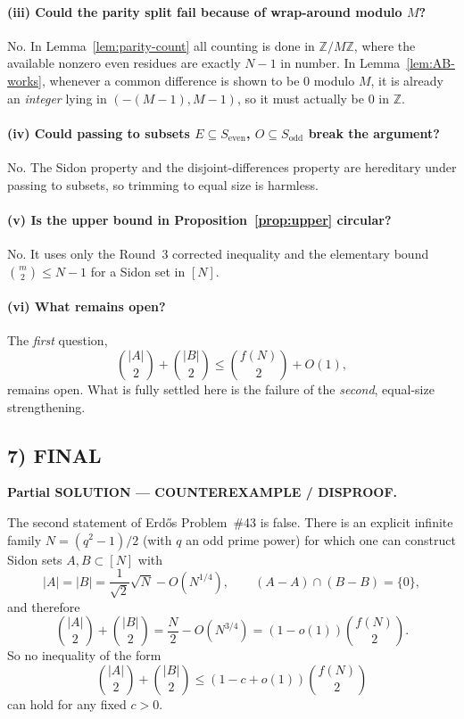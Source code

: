 \paragraph{(iii) Could the parity split fail because of wrap-around modulo $M$?}
No.  In Lemma~\ref{lem:parity-count} all counting is done in $\mathbb Z/M\mathbb Z$, where the available nonzero even residues are exactly $N-1$ in number.  In Lemma~\ref{lem:AB-works}, whenever a common difference is shown to be $0$ modulo $M$, it is already an \emph{integer} lying in $(-(M-1),M-1)$, so it must actually be $0$ in $\mathbb Z$.

\paragraph{(iv) Could passing to subsets $E\subseteq S_{\mathrm{even}}$, $O\subseteq S_{\mathrm{odd}}$ break the argument?}
No.  The Sidon property and the disjoint-differences property are hereditary under passing to subsets, so trimming to equal size is harmless.

\paragraph{(v) Is the upper bound in Proposition~\ref{prop:upper} circular?}
No.  It uses only the Round~3 corrected inequality and the elementary bound $\binom{m}{2}\le N-1$ for a Sidon set in $[N]$.

\paragraph{(vi) What remains open?}
The \emph{first} question,
\[
\binom{|A|}{2}+\binom{|B|}{2}\le \binom{f(N)}{2}+O(1),
\]
remains open.  What is fully settled here is the failure of the \emph{second}, equal-size strengthening.

\subsection{7) FINAL}

\textbf{Partial SOLUTION --- COUNTEREXAMPLE / DISPROOF.}

The second statement of Erd\H{o}s Problem~\#43 is false.
There is an explicit infinite family $N=(q^2-1)/2$ (with $q$ an odd prime power) for which one can construct Sidon sets $A,B\subset[N]$ with
\[
|A|=|B|=\frac1{\sqrt2}\sqrt N-O(N^{1/4}),
\qquad
(A-A)\cap(B-B)=\{0\},
\]
and therefore
\[
\binom{|A|}{2}+\binom{|B|}{2}=\frac N2-O(N^{3/4})=(1-o(1))\binom{f(N)}{2}.
\]
So no inequality of the form
\[
\binom{|A|}{2}+\binom{|B|}{2}\le (1-c+o(1))\binom{f(N)}{2}
\]
can hold for any fixed $c>0$.

